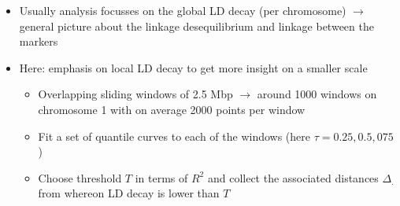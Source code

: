 \documentclass[a0paper,portrait]{baposter}
\begin{document}
\begin{poster}
{\begin{itemize}[leftmargin=*]
\item Usually analysis focusses on the global LD decay (per chromosome) $\rightarrow$ general picture about the 
	linkage desequilibrium and linkage between the markers
\item Here: emphasis on local LD decay to get more insight on a smaller scale
	\begin{itemize}[leftmargin=*]
	\item Overlapping sliding windows of 2.5 Mbp $\rightarrow$ around 1000 windows on chromosome 1 with on average 
			2000 points per window
	\item Fit a set of quantile curves to each of the windows (here $\tau=0.25, 0.5, 075$)
	\item Choose threshold $T$ in terms of $R^2$ and collect the associated distances $\Delta_{.}$ from whereon LD decay is 	
		lower than $T$
	\end{itemize}
%
\end{itemize}
}








\end{poster}
\end{document}
